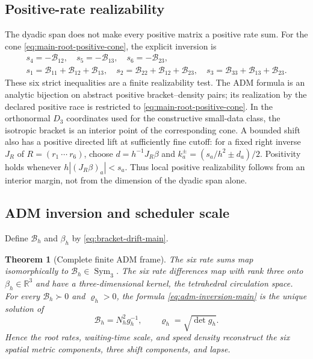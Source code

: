 \documentclass[11pt]{article}
\newtheorem{theorem}{Theorem}[section]
\numberwithin{equation}{section}
\theoremstyle{definition}
\theoremstyle{remark}
\newcommand{\R}{\mathbb R}
\newcommand{\Sym}{\operatorname{Sym}}
\begin{document}
\subsection{Positive-rate realizability}

The dyadic span does not make every positive matrix a positive rate sum.
For the cone \eqref{eq:main-root-positive-cone}, the explicit inversion is
\begin{equation}
 \begin{gathered}
 s_4=-\mathcal B_{12},\quad s_5=-\mathcal B_{13},\quad
 s_6=-\mathcal B_{23},\\
 s_1=\mathcal B_{11}+\mathcal B_{12}+\mathcal B_{13},\quad
 s_2=\mathcal B_{22}+\mathcal B_{12}+\mathcal B_{23},\quad
 s_3=\mathcal B_{33}+\mathcal B_{13}+\mathcal B_{23}.
 \end{gathered}
 \label{eq:main-root-cone-inverse}
\end{equation}
These six strict inequalities are a finite realizability test. The ADM
formula is an analytic bijection on abstract positive bracket--density
pairs; its realization by the declared positive race is restricted to
\eqref{eq:main-root-positive-cone}. In the orthonormal $D_3$ coordinates
used for the constructive small-data class, the isotropic bracket is an
interior point of the corresponding cone. A bounded shift also has a positive
directed lift at sufficiently fine cutoff: for a fixed right inverse $J_R$
of $R=(r_1\ \cdots\ r_6)$, choose
$d=h^{-1}J_R\beta$ and
$k_a^\pm=(s_a/h^2\pm d_a)/2$. Positivity holds whenever
$h|(J_R\beta)_a|<s_a$. Thus local positive realizability follows from an
interior margin, not from the dimension of the dyadic span alone.
\subsection{ADM inversion and scheduler scale}

Define $\mathcal B_h$ and $\beta_h$ by
\eqref{eq:bracket-drift-main}.

\begin{theorem}[Complete finite ADM frame]
\label{thm:supp-adm-frame}
The six rate sums map isomorphically to $\mathcal B_h\in\Sym_3$.  The six rate
differences map with rank three onto $\beta_h\in\R^3$ and have a
three-dimensional kernel, the tetrahedral circulation space.  For every
$\mathcal B_h\succ0$ and $\varrho_h>0$, the formula
\eqref{eq:adm-inversion-main} is the unique solution of
\begin{equation}
 \mathcal B_h=N_h^2g_h^{-1},
 \qquad
 \varrho_h=\sqrt{\det g_h}.
 \label{eq:supp-adm-characterization}
\end{equation}
Hence the root rates, waiting-time scale, and speed density reconstruct the six
spatial metric components, three shift components, and lapse.
\end{theorem}
\end{document}

